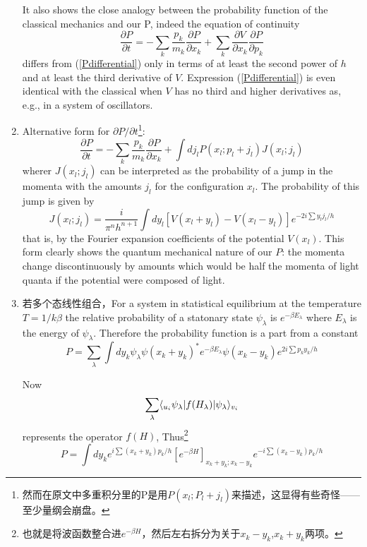 \begin{enumerate}
 	It also shows the close analogy between the probability function of the classical mechanics and our P, indeed the equation of continuity
 	\begin{equation}
 	\frac{\partial P}{\partial t}= -\sum_k \frac{p_k}{m_k}\frac{\partial P}{\partial x_k} + \sum_k \frac{\partial V}{\partial x_k}\frac{\partial P}{\partial p_k}
 	\end{equation}
 	differs from (\ref{Pdifferential}) only in terms of at least the second power of $h$ and at least the third derivative of $V$. Expression (\ref{Pdifferential}) is even identical with the classical when $V$ has no third and higher derivatives as, e.g., in a system of oscillators.

 	\item Alternative form for $\partial P/ \partial t$\footnote{然而在原文中多重积分里的P是用$P(x_l;P_l+j_l)$来描述，这显得有些奇怪——至少量纲会崩盘。}:
 	\begin{equation}
 	\frac{\partial P}{\partial t}= - \sum_k \frac{p_k}{m_k}\frac{\partial P}{\partial x_k}+\int dj_l P(x_l;p_l+j_l)J(x_l;j_l)
 	\end{equation}
 	wherer $J(x_l;j_l)$ can be interpreted as the probability of a jump in the momenta with the amounts $j_l$ for the configuration $x_l$. The probability of this jump is given by
 	\begin{equation}
 	J(x_l;j_l)=\frac{i}{\pi^nh^{n+1}}\int dy_l [V(x_l+y_l)-V(x_l-y_l)]e^{-2i\sum y_l j_l/h}
 	\end{equation}
 	that is, by the Fourier expansion coefficients of the potential $V(x_l)$. This form clearly shows the quantum mechanical nature of our $P$: the momenta change discontinuously by amounts which would be half the momenta of light quanta if the potential were composed of light.

 	\item 若多个态线性组合，For a system in statistical equilibrium at the temperature $T=1/k\beta$ the relative probability of a statonary state $\psi_\lambda$ is $e^{-\beta E_\lambda}$ where $E_\lambda$ is the energy of $\psi_\lambda$. Therefore the probability function is a part from a constant
 	\begin{equation}
 	P=\sum_\lambda \int dy_k \psi_\lambda \psi(x_k+y_k)^* e^{-\beta E_\lambda} \psi(x_k-y_k) e^{2i\sum p_ky_k/h}
 	\end{equation}

 	Now
 	\begin{equation}
 	\sum_\lambda \langle _{u_i}\psi_\lambda | f(H_\lambda) | \psi_\lambda \rangle_{v_i}
 	\end{equation}
 	represents the operator $f(H)$, Thus\footnote{也就是将波函数整合进$e^{-\beta H}$，然后左右拆分为关于$x_k-y_k$,$x_k+y_k$两项。}
 	\begin{equation}
 	P=\int dy_k e^{i\sum(x_k+y_k)p_k/h}[e^{-\beta H}]_{x_k+y_k;x_k-y_k}e^{-i\sum(x_k-y_k)p_k/h}
 	\end{equation}
\end{enumerate}


